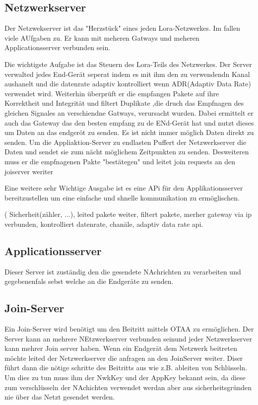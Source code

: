 \documentclass[a4paper,12pt]{article}
\begin{document}
        \subsection{Netzwerkserver}
            Der Netzwekserver ist das "Herzstück" eines jeden Lora-Netzwerkes. Im fallen viele AUfgaben zu. Er kann mit meheren Gatways und meheren Applicationsserver verbunden sein.

            Die wichtigste Aufgabe ist das Steuern des Lora-Teils des Netzwerkes. Der Server verwalted jedes End-Gerät seperat indem es mit ihm den zu verwendendn Kanal aushanelt und die datenrate adaptiv kontrolliert wenn ADR(Adaptiv Data Rate) verwendet wird.
            Weiterhin überprüft er die empfangen Pakete auf ihre Korrektheit und Integrität und filtert Duplikate ,die druch das Empfnagen des gleichen Signales an verschiendne Gatways, verursacht wurden. Dabei ermittelt er auch das Gateway das den besten empfang zu de ENd-Gerät hat und nutzt dieses um Daten an das endgeröt zu senden.
            Es ist nicht immer möglich Daten direkt zu senden. Um die Appliaktion-Server zu endlasten Puffert der Netzwerkserver die Daten und sendet sie zum nächt möglichem Zeitpunkten zu senden.
            Desweiteren muss er die empfnagenen Pakte "bestätegen" und leitet join requests an den joiserver weriter

            Eine weitere sehr Wichtige Ausgabe ist es eine APi für den Applikationsserver bereitzustellen um eine einfache und shnelle kommunikation zu ermöglischen.
            
            \cite{LoRaSpec}( Sicherheit(zähler, ...), leited pakete weiter, filtert pakete, merher gateway via ip verbunden, kontrolliert datenrate, chanäle, adaptiv data rate api.
        \subsection{Applicationsserver}
            Dieser Server ist zuständig den die gesendete NAchrichten zu verarbeiten und gegebenenfals sebst welche an die Endgeräte zu senden.
        \subsection{Join-Server}
            Ein Join-Server wird benötigt um den Beitritt mittels OTAA zu ermöglichen. Der Server kann an mehrere NEtzwerkserver verbunden seinund jeder Netzwerkserver kann mehrer Join server haben.
            Wenn ein Endgerät dem Netzwerk beitreten möchte leited der Netzwerkserver die anfragen an den JoinServer weiter. Diser führt dann die nötige schritte des Beitritts aus wie z.B. ableiten von Schlüsseln.
            Um dies zu tun muss ihm der NwkKey und der AppKey bekannt sein, da diese zum verschlüsseln der NAchichten verwendet werdan aber aus sicherheitsgründen nie über das Netzt gesendet werden.
\end{document}
